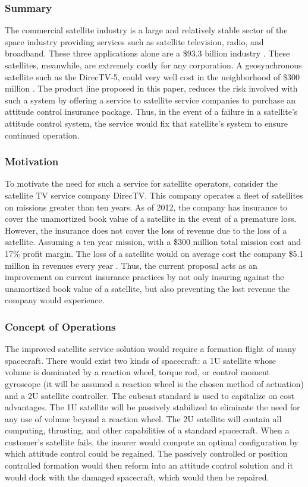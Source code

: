 \subsubsection{Summary}
The commercial satellite industry is a large and relatively stable sector of the space industry providing services such as satellite television, radio, and broadband. These three applications alone are a \$93.3 billion industry \cite{SIA}. These satellites, meanwhile, are extremely costly for any corporation. A geosynchronous satellite such as the DirecTV-5, could very well cost in the neighborhood of \$300 million \cite{SMAD}. The product line proposed in this paper, reduces the risk involved with such a system by offering a service to satellite service companies to purchase an attitude control insurance package. Thus, in the event of a failure in a satellite's attitude control system, the service would fix that satellite's system to ensure continued operation. 
 
\subsubsection{Motivation}
To motivate the need for such a service for satellite operators, consider the satellite TV service company DirecTV. This company operates a fleet of satellites on missions greater than ten years. As of 2012, the company has insurance to cover the unamortized  book value of a satellite in the event of a premature loss. However, the insurance does not cover the loss of revenue due to the loss of a satellite. Assuming a ten year mission, with a \$300 million total mission cost and 17\% profit margin. The loss of a satellite would on average cost the company \$5.1 million in revenues every year \cite{DirecTV}. Thus, the current proposal acts as an improvement on current insurance practices by not only insuring against the unamortized book value of a satellite, but also preventing the lost revenue the company would experience. 

\subsubsection{Concept of Operations}
The improved satellite service solution would require a formation flight of many spacecraft. There would exist two kinds of spacecraft: a 1U satellite whose volume is dominated by a reaction wheel, torque rod, or control moment gyroscope (it will be assumed a reaction wheel is the chosen method of actuation) and a 2U satellite controller. The cubesat standard is used to capitalize on cost advantages. The 1U satellite will be passively stabilized to eliminate the need for any use of volume beyond a reaction wheel. The 2U satellite will contain all computing, thrusting, and other capabilities of a standard spacecraft. When a  customer's satellite fails, the insurer would compute an optimal configuration by which attitude control could be regained. The passively controlled or position controlled formation would then reform into an attitude control solution and it would dock with the damaged spacecraft, which would then be repaired.

